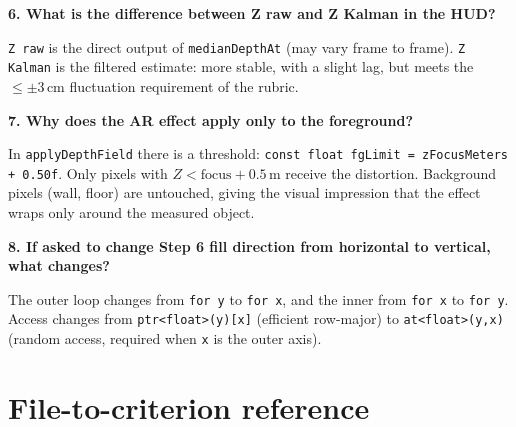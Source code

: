 \documentclass[11pt,a4paper]{article}
\begin{document}
\vspace{6pt}
\textbf{6. What is the difference between Z raw and Z Kalman in the HUD?}

\texttt{Z raw} is the direct output of \texttt{medianDepthAt} (may vary frame to frame).
\texttt{Z Kalman} is the filtered estimate: more stable, with a slight lag, but meets
the $\leq \pm 3\,\text{cm}$ fluctuation requirement of the rubric.

\vspace{6pt}
\textbf{7. Why does the AR effect apply only to the foreground?}

In \texttt{applyDepthField} there is a threshold: \texttt{const float fgLimit = zFocusMeters + 0.50f}.
Only pixels with $Z < \text{focus} + 0.5\,\text{m}$ receive the distortion.
Background pixels (wall, floor) are untouched, giving the visual impression that
the effect wraps only around the measured object.

\vspace{6pt}
\textbf{8. If asked to change Step 6 fill direction from horizontal to vertical, what changes?}

The outer loop changes from \texttt{for y} to \texttt{for x}, and the inner from
\texttt{for x} to \texttt{for y}. Access changes from \texttt{ptr<float>(y)[x]}
(efficient row-major) to \texttt{at<float>(y,x)} (random access, required when
\texttt{x} is the outer axis).

\section*{File-to-criterion reference}
\end{document}
